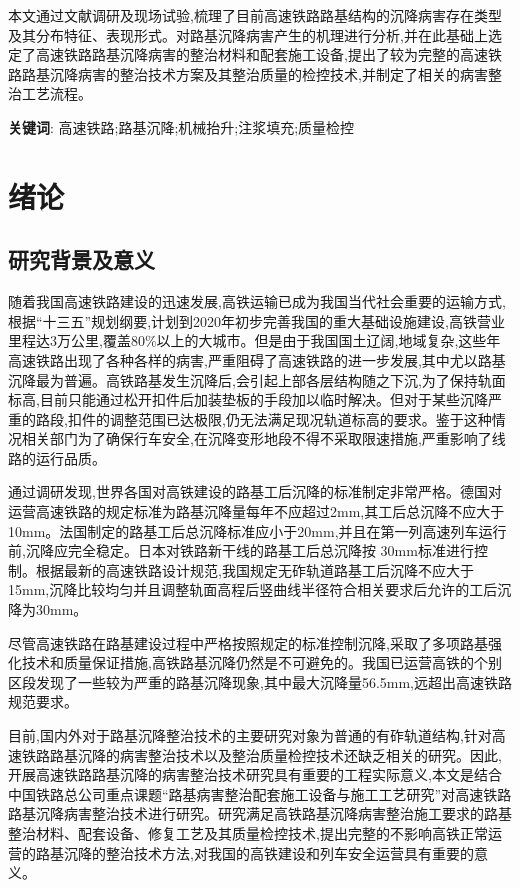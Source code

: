 \documentclass[a4paper,12pt]{ctexrep}
\begin{document}
本文通过文献调研及现场试验,梳理了目前高速铁路路基结构的沉降病害存在类型及其分布特征、表现形式。对路基沉降病害产生的机理进行分析,并在此基础上选定了高速铁路路基沉降病害的整治材料和配套施工设备,提出了较为完整的高速铁路路基沉降病害的整治技术方案及其整治质量的检控技术,并制定了相关的病害整治工艺流程。

\vspace{1em}
\noindent \textbf{关键词}: 高速铁路;路基沉降;机械抬升;注浆填充;质量检控

\clearpage

\tableofcontents
\clearpage

\chapter{绪论}

\section{研究背景及意义}

随着我国高速铁路建设的迅速发展,高铁运输已成为我国当代社会重要的运输方式,根据“十三五”规划纲要,计划到2020年初步完善我国的重大基础设施建设,高铁营业里程达3万公里,覆盖80\%以上的大城市。但是由于我国国土辽阔,地域复杂,这些年高速铁路出现了各种各样的病害,严重阻碍了高速铁路的进一步发展,其中尤以路基沉降最为普遍。高铁路基发生沉降后,会引起上部各层结构随之下沉,为了保持轨面标高,目前只能通过松开扣件后加装垫板的手段加以临时解决。但对于某些沉降严重的路段,扣件的调整范围已达极限,仍无法满足现况轨道标高的要求。鉴于这种情况相关部门为了确保行车安全,在沉降变形地段不得不采取限速措施,严重影响了线路的运行品质。

通过调研发现,世界各国对高铁建设的路基工后沉降的标准制定非常严格。德国对运营高速铁路的规定标准为路基沉降量每年不应超过2mm,其工后总沉降不应大于10mm。法国制定的路基工后总沉降标准应小于20mm,并且在第一列高速列车运行前,沉降应完全稳定。日本对铁路新干线的路基工后总沉降按 30mm标准进行控制。根据最新的高速铁路设计规范,我国规定无砟轨道路基工后沉降不应大于15mm,沉降比较均匀并且调整轨面高程后竖曲线半径符合相关要求后允许的工后沉降为30mm。

尽管高速铁路在路基建设过程中严格按照规定的标准控制沉降,采取了多项路基强化技术和质量保证措施,高铁路基沉降仍然是不可避免的。我国已运营高铁的个别区段发现了一些较为严重的路基沉降现象,其中最大沉降量56.5mm,远超出高速铁路规范要求。

目前,国内外对于路基沉降整治技术的主要研究对象为普通的有砟轨道结构,针对高速铁路路基沉降的病害整治技术以及整治质量检控技术还缺乏相关的研究。因此,开展高速铁路路基沉降的病害整治技术研究具有重要的工程实际意义,本文是结合中国铁路总公司重点课题“路基病害整治配套施工设备与施工工艺研究”对高速铁路路基沉降病害整治技术进行研究。研究满足高铁路基沉降病害整治施工要求的路基整治材料、配套设备、修复工艺及其质量检控技术,提出完整的不影响高铁正常运营的路基沉降的整治技术方法,对我国的高铁建设和列车安全运营具有重要的意义。
\end{document}
